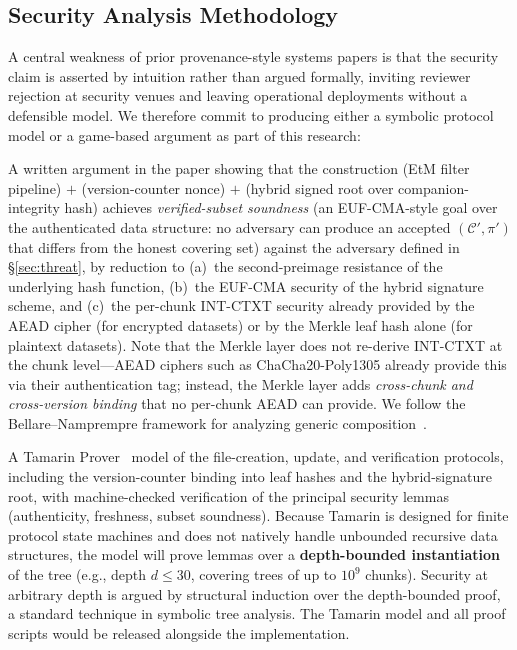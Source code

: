 \documentclass[11pt]{article}
\begin{document}
\subsection{Security Analysis Methodology}
\label{sec:security-analysis}

A central weakness of prior provenance-style systems papers is that the
security claim is asserted by intuition rather than argued formally,
inviting reviewer rejection at security venues and leaving operational
deployments without a defensible model. We therefore commit to producing
either a symbolic protocol model or a game-based argument as part of this
research:

\begin{description}[nosep]
  \item[Game-based argument (baseline, in scope).]
    A written argument in the paper showing that the construction
    (EtM filter pipeline) $+$ (version-counter nonce) $+$ (hybrid
    signed root over companion-integrity hash) achieves
    \emph{verified-subset soundness} (an EUF-CMA-style goal over the
    authenticated data structure: no adversary can produce an accepted
    $(\mathcal{C}', \pi')$ that differs from the honest covering set) against
    the adversary defined in \S\ref{sec:threat}, by reduction to
    (a)~the second-preimage resistance of the underlying hash function,
    (b)~the EUF-CMA security of the hybrid signature scheme, and
    (c)~the per-chunk INT-CTXT security already provided by the AEAD cipher
    (for encrypted datasets) or by the Merkle leaf hash alone (for plaintext
    datasets). Note that the Merkle layer does not re-derive INT-CTXT at the
    chunk level---AEAD ciphers such as ChaCha20-Poly1305 already provide this
    via their authentication tag; instead, the Merkle layer adds
    \emph{cross-chunk and cross-version binding} that no per-chunk AEAD can
    provide. We follow the Bellare--Namprempre framework for analyzing generic
    composition~\cite{bellare2000encrypt}.
  \item[Symbolic model (stretch, preferred for security venues).]
    A Tamarin Prover~\cite{meier2013tamarin} model of the file-creation,
    update, and verification protocols, including the version-counter
    binding into leaf hashes and the hybrid-signature root, with
    machine-checked verification of the principal security lemmas
    (authenticity, freshness, subset soundness). Because Tamarin is
    designed for finite protocol state machines and does not natively
    handle unbounded recursive data structures, the model will prove
    lemmas over a \textbf{depth-bounded instantiation} of the tree
    (e.g., depth $d \leq 30$, covering trees of up to $10^9$ chunks).
    Security at arbitrary depth is argued by structural induction over the
    depth-bounded proof, a standard technique in symbolic tree analysis.
    The Tamarin model and all proof scripts would be released alongside
    the implementation.
\end{description}
\end{document}
